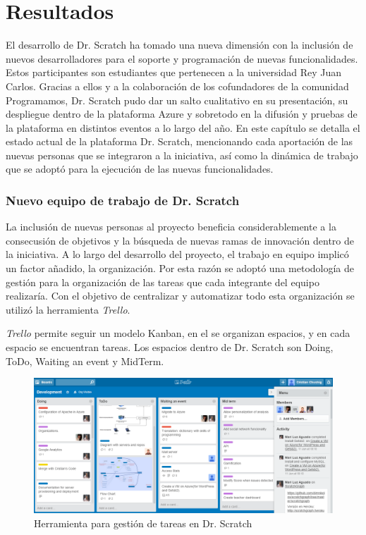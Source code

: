 \documentclass[a4paper, 12pt]{book}
\begin{document}
\cleardoublepage
\chapter{Resultados}

El desarrollo de Dr. Scratch ha tomado una nueva dimensión con la inclusión de nuevos 
desarrolladores para el soporte y programación de nuevas funcionalidades. Estos 
participantes son estudiantes que pertenecen a la universidad Rey Juan Carlos. Gracias
a ellos y a la colaboración de los cofundadores de la comunidad Programamos,
Dr. Scratch pudo dar un salto cualitativo en su presentación, su despliegue dentro 
de la plataforma Azure y sobretodo en la difusión y pruebas de la plataforma en 
distintos eventos a lo largo del año. En este capítulo se detalla el estado actual de 
la plataforma Dr. Scratch, mencionando cada aportación de las nuevas personas que se 
integraron a la iniciativa, así como la dinámica de trabajo que se adoptó para la 
ejecución de las nuevas funcionalidades.

\subsection{Nuevo equipo de trabajo de Dr. Scratch}

La inclusión de nuevas personas al proyecto beneficia considerablemente a la 
consecusión de objetivos y la búsqueda de nuevas ramas de innovación dentro de la
iniciativa. A lo largo del desarrollo del proyecto, el trabajo en equipo implicó
un factor añadido, la organización. Por esta razón se adoptó una metodología de 
gestión para la organización de las tareas que cada integrante del equipo realizaría. 
Con el objetivo de centralizar y automatizar todo esta organización se utilizó
la herramienta \emph{Trello}.  

\emph{Trello} permite seguir un modelo Kanban, en el se organizan espacios, y en
cada espacio se encuentran tareas. Los espacios dentro de Dr. Scratch son Doing, ToDo,
Waiting an event y MidTerm.

\begin{figure}
	\graphicspath{{img/}}
  \includegraphics[bb=0 0 800 600, width=12cm, keepaspectratio]{trello.png}
	\caption{Herramienta para gestión de tareas en Dr. Scratch}
  \label{figura:foro_hilos}
\end{figure}
\end{document}
